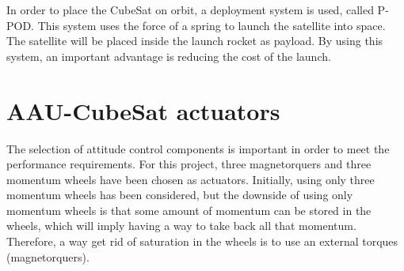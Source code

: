 In order to place the CubeSat on orbit, a deployment system is used, called P-POD. This system uses the force of a spring to launch the satellite into space. The satellite will be placed inside the launch rocket as payload. By using this system, an important advantage is reducing the cost of the launch. \cite{PPOD}
%
\section{AAU-CubeSat actuators}
The selection of attitude control components is important in order to meet the performance requirements. For this project, three magnetorquers and three momentum wheels have been chosen as actuators. Initially, using only three momentum wheels has been considered, but the downside of using only momentum wheels is that some amount of momentum can be stored in the wheels, which will imply having a way to take back all that momentum. Therefore, a way get rid of saturation in the wheels is to use an external torques (magnetorquers). 

